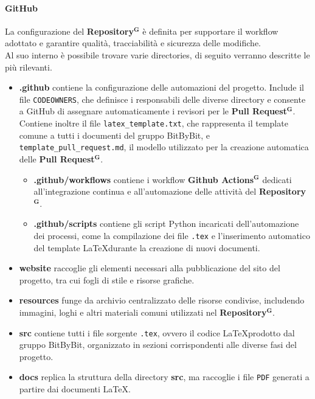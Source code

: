 \documentclass[a4paper,12pt]{article}
\newcommand{\term}[1]{\textbf{#1}$^\mathbf{G}$}
\begin{document}
\paragraph{GitHub} 
La configurazione del \term{Repository} è definita per supportare il workflow adottato e garantire qualità, tracciabilità e sicurezza delle modifiche.\\
Al suo interno è possibile trovare varie directories, di seguito verranno descritte le più rilevanti.
\begin{itemize}
    \item \textbf{.github} contiene la configurazione delle automazioni del progetto. Include il file \texttt{CODEOWNERS}, che definisce i responsabili delle diverse directory e consente a GitHub di assegnare automaticamente i revisori per le \term{Pull Request}. Contiene inoltre il file \texttt{latex\_template.txt}, che rappresenta il template comune a tutti i documenti del gruppo BitByBit, e \texttt{template\_pull\_request.md}, il modello utilizzato per la creazione automatica delle \term{Pull Request}.
    \begin{itemize}
        \item \textbf{.github/workflows} contiene i workflow \term{Github Actions} dedicati all’integrazione continua e all’automazione delle attività del \term{Repository}.
        \item \textbf{.github/scripts} contiene gli script Python incaricati dell’automazione dei processi, come la compilazione dei file \texttt{.tex} e l’inserimento automatico del template \LaTeX durante la creazione di nuovi documenti.
    \end{itemize}
    \item \textbf{website} raccoglie gli elementi necessari alla pubblicazione del sito del progetto, tra cui fogli di stile e risorse grafiche.
    \item \textbf{resources} funge da archivio centralizzato delle risorse condivise, includendo immagini, loghi e altri materiali comuni utilizzati nel \term{Repository}.
    \item \textbf{src} contiene tutti i file sorgente \texttt{.tex}, ovvero il codice \LaTeX prodotto dal gruppo BitByBit, organizzato in sezioni corrispondenti alle diverse fasi del progetto.
    \item \textbf{docs} replica la struttura della directory \textbf{src}, ma raccoglie i file \texttt{PDF} generati a partire dai documenti \LaTeX.
\end{itemize}
\end{document}

